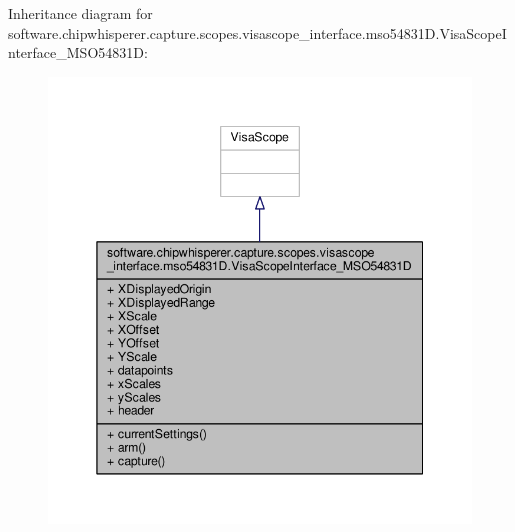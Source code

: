 Inheritance diagram for software.\+chipwhisperer.\+capture.\+scopes.\+visascope\+\_\+interface.\+mso54831\+D.\+Visa\+Scope\+Interface\+\_\+\+M\+S\+O54831\+D\+:\nopagebreak
\begin{figure}[H]
\begin{center}
\leavevmode
\includegraphics[width=345pt]{d5/dde/classsoftware_1_1chipwhisperer_1_1capture_1_1scopes_1_1visascope__interface_1_1mso54831D_1_1Visa415aed1800246050f4240455726c0450}
\end{center}
\end{figure}


